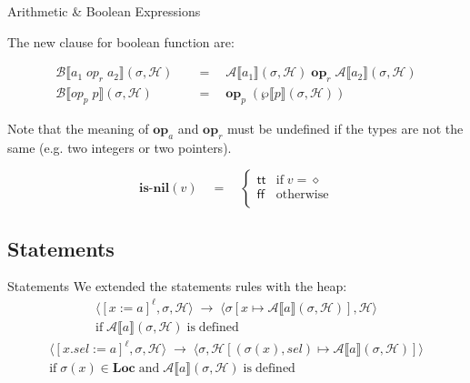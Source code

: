 \documentclass[xcolor=svgnames,11pt]{beamer}
\begin{document}
\begin{frame}{Arithmetic \& Boolean Expressions}

The new clause for boolean function are:

\begin{align*}
\mathcal{B} \llbracket a_1 \; op_r \; a_2 \rrbracket (\sigma, \mathcal{H}) \quad &= \quad \mathcal{A} \llbracket a_1 \rrbracket (\sigma, \mathcal{H}) \;\mathbf{op}_r\; \mathcal{A} \llbracket a_2 \rrbracket (\sigma, \mathcal{H}) \\
\mathcal{B} \llbracket op_p \; p \rrbracket (\sigma, \mathcal{H}) \quad &= \quad \mathbf{op}_p\; (\wp \llbracket p \rrbracket (\sigma, \mathcal{H}))
\end{align*}

\begin{block}{}
Note that the meaning of $\mathbf{op}_a$ and $\mathbf{op}_r$ must be undefined if the types are not the same (e.g. two integers or two pointers).
\end{block}


$$
\mathbf{is\text{-}nil}(v) \quad = \quad \left\{
\begin{array}{ll}
\mathsf{tt} & \mathrm{if}\; v = \diamond \\
\mathsf{ff} & \mathrm{otherwise} \\
\end{array}
\right.$$
\end{frame}

\subsection{Statements}
\begin{frame}{Statements}
We extended the statements rules with the heap:
$$
\begin{array}{cc}
\langle[x:=a]^\ell,\sigma,\mathcal{H}\rangle \;\rightarrow\; \langle \sigma[x \mapsto \mathcal{A}\llbracket a \rrbracket (\sigma, \mathcal{H})], \mathcal{H} \rangle
\\
\mathrm{if}\; \mathcal{A}\llbracket a \rrbracket (\sigma, \mathcal{H}) \;\mathrm{is\;defined}
\end{array}
$$
\pause
$$
\begin{array}{cc}
\langle[x.sel:=a]^\ell,\sigma,\mathcal{H}\rangle \;\rightarrow\; \langle \sigma, \mathcal{H}[(\sigma(x),sel) \mapsto \mathcal{A}\llbracket a \rrbracket (\sigma, \mathcal{H})] \rangle
\\
\mathrm{if}\; \sigma(x) \in \mathbf{Loc} \;\mathrm{and}\; \mathcal{A}\llbracket a \rrbracket (\sigma, \mathcal{H}) \;\mathrm{is\;defined}
\end{array}
$$
\end{frame}
\end{document}
